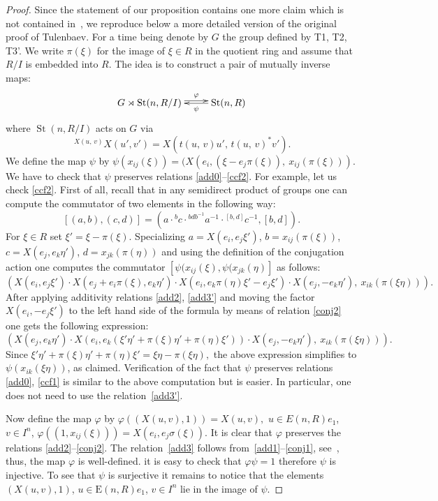 \documentclass[11pt]{amsart}
\theoremstyle{plain} \declaretheorem[name=Theorem, Refname={Theorem,Theorems}]{tm} \Crefname{tm}{Theorem}{Theorems}
\numberwithin{equation}{section}
\theoremstyle{definition} \newtheorem{df}[lm]{Definition} \Crefname{df}{Definition}{Definitions}
\theoremstyle{remark} \newtheorem{rk}[lm]{Remark} \Crefname{rk}{Remark}{Remarks}
\newcommand{\E}{{\mathrm{E}}}
\newcommand{\St}{\mathop{\mathrm{St}}\nolimits}
\begin{document}
\begin{proof} 
Since the statement of our proposition contains one more claim which is not contained in~\cite[Proposition~1.6]{Tul}, we reproduce below a more detailed version of the original proof of Tulenbaev.
For a time being denote by $G$ the group defined by T1, T2, T3'. We write $\pi(\xi)$ for the image of $\xi\in R$ in the quotient ring and assume that $R/I$ is embedded into $R$. The idea is to construct a pair of mutually inverse maps:
$$\xymatrix{G\rtimes \St(n, R/I) \ar@<0.6ex>[r]^-\varphi &  \ar[l]^-\psi \St(n, R)}$$
where $\St(n, R/I)$ acts on $G$ via $$\,^{X(u,\,v)}X(u',v')=X(t(u,\,v)u',\,t(u,\,v)^*v').$$
We define the map $\psi$ by $\psi(x_{ij}(\xi)) = (X(e_i, (\xi - e_j\pi(\xi)),\ x_{ij}(\pi(\xi)))$. 
We have to check that $\psi$ preserves relations \eqref{add0}--\eqref{ccf2}.
For example, let us check \eqref{ccf2}. 
First of all, recall that in any semidirect product of groups one can compute the commutator of two elements in the following way:
$$[(a, b), (c, d)] = (a \cdot {}^bc \cdot {}^{bdb^{-1}}a^{-1} \cdot {}^{[b, d]}c^{-1} , [b, d]).$$
For $\xi\in R$ set $\xi' = \xi - \pi(\xi)$.
Specializing $a = X(e_i,  e_j\xi')$, $b = x_{ij}(\pi(\xi))$, $c = X(e_j, e_k\eta')$, $d = x_{jk}(\pi(\eta))$ and using the definition of the conjugation action 
one computes the commutator $[\psi(x_{ij}(\xi), \psi(x_{jk}(\eta)]$ as follows:
\setcounter{equation}{2}
\begin{equation} \left(X(e_i,  e_j\xi') \cdot X(e_j + e_i\pi(\xi), e_k\eta') \cdot X(e_i,  e_k\pi(\eta)\xi' -  e_j\xi') \cdot X(e_j, -e_k\eta'),\ x_{ik}(\pi(\xi\eta))\right). \label{eq:proofS3}\end{equation}
\setcounter{lm}{3}
After applying additivity relations \eqref{add2}, \eqref{add3'} and moving the factor $X(e_i, - e_j\xi')$ to the left hand side of the formula by means of relation \eqref{conj2}
one gets the following expression:
$$\left(X(e_j, e_k\eta') \cdot X(e_i, e_k(\xi' \eta' + \pi(\xi)\eta' + \pi(\eta)\xi')) \cdot X(e_j, -e_k\eta'),\ x_{ik}(\pi(\xi\eta))\right).$$
Since $\xi'\eta' + \pi(\xi)\eta' + \pi(\eta)\xi' = \xi\eta - \pi(\xi\eta),$ the above expression simplifies to $\psi(x_{ik}(\xi\eta))$, as claimed.
Verification of the fact that $\psi$ preserves relations \eqref{add0}, \eqref{ccf1} is similar to the above computation but is easier.
In particular, one does not need to use the relation~\eqref{add3'}.

Now define the map $\varphi$ by $\varphi\left((X(u, v), 1)\right) = X(u, v),$ $u\in E(n, R)e_1$, $v\in I^n$, $\varphi\left((1, x_{ij}(\xi))\right) = X(e_i, e_j\sigma(\xi))$.
It is clear that $\varphi$ preserves the relations \eqref{add2}--\eqref{conj2}. The relation~\eqref{add3} follows from~\eqref{add1}--\ref{conj1}, see~\cite[(1.3)]{Tul}, thus, the map $\varphi$ is well-defined.
it is easy to check that $\varphi\psi=1$ therefore $\psi$ is injective. To see that $\psi$ is surjective it remains to notice that the elements $(X(u,v), 1)$, $u\in \E(n, R)e_1$, $v\in I^n$ lie in the image of $\psi$.
\end{proof}
\end{document}
